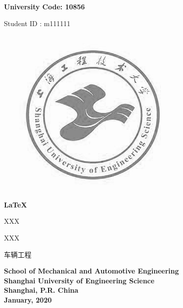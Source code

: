 

\newpage

    {\noindent \songti\sihao\bfseries
            \hspace{18em} University Code: 10856
    
            \hspace{17em} Student \quad ID : m111111
    }
    
    \begin{center}
            \includegraphics[scale=0.4]{images/logo}
    \end{center}
    
    \begin{center}\songti\yihao\bfseries
            \LaTeX
    \end{center}
    
    \vspace{4cm}
    \begin{description}[
                    labelindent=4.5cm,
                    topsep=1cm,
                    format=\sanhao
            ]\songti\sanhao
            \item[Candidate:] XXX
            \item[Supervisor:] XXX
            \item[\qquad Major:] 车辆工程
    \end{description}
    
    \vspace{1cm}
    \begin{center}\sanhao\textbf{
        School of Mechanical and Automotive Engineering \\
        Shanghai University of Engineering Science \\
        Shanghai, P.R. China \\
        January, 2020
    }
    \end{center}
